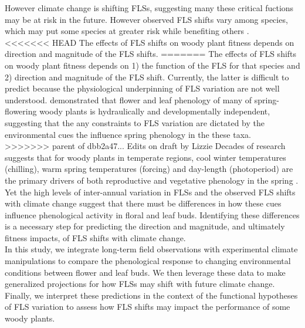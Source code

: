 \documentclass[11pt]{article}
\begin{document}
\noindent However climate change is shifting FLSs, suggesting many these critical fuctions may be at risk in the future.   However observed FLS shifts vary among species, which may put some species at greater risk while benefiting others \citep{Buonaiuto2020}.\\ 

<<<<<<< HEAD
\noindent The effects of FLS shifts on woody plant fitness depends on direction and magnitude of the FLS shifts.
=======
\noindent The effects of FLS shifts on woody plant fitness depends on 1) the function of the FLS for that species and 2) direction and magnitude of the FLS shift. Currently, the latter is difficult to predict because the physiological underpinning of FLS variation are not well understood. \citet{Savage2019} demonstrated that flower and leaf phenology of many of spring-flowering woody plants is hydraulically and developmentally independent, suggesting that the any constraints to FLS variation are dictated by the environmental cues the influence spring phenology in the these taxa.\\

>>>>>>> parent of dbb2a47... Edits on draft by Lizzie
\noindent Decades of research suggests that for woody plants in temperate regions, cool winter temperatures (chilling), warm spring temperatures (forcing) and day-length (photoperiod) are the primary drivers of both reproductive and vegetative phenology in the spring \citep{Forrest2018,Flynn2018}. Yet the high levels of inter-annual variation in FLSs and the observed FLS shifts with climate change suggest that there must be differences in how these cues influence phenological activity in floral and leaf buds. Identifying these differences is a necessary step for predicting the direction and magnitude, and ultimately fitness impacts, of FLS shifts with climate change. \\

\noindent In this study, we integrate long-term field observations with experimental climate manipulations to compare the phenological response to changing environmental conditions between flower and leaf buds. We then leverage these data to make generalized projections for how FLSs may shift with future climate change. Finally, we interpret these predictions in the context of the functional hypotheses of FLS variation to assess how FLS shifts may impact the performance of some woody plants.\\  
\end{document}
